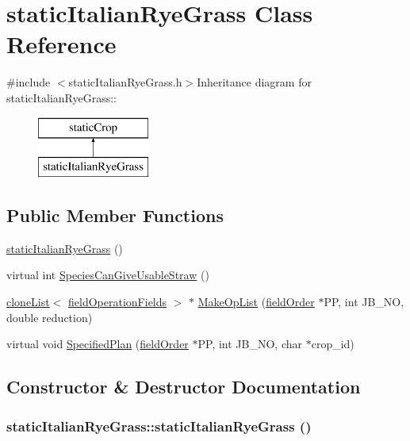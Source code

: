 \hypertarget{classstatic_italian_rye_grass}{
\section{staticItalianRyeGrass Class Reference}
\label{classstatic_italian_rye_grass}
}


{\ttfamily \#include $<$staticItalianRyeGrass.h$>$}Inheritance diagram for staticItalianRyeGrass::\begin{figure}[H]
\begin{center}
\leavevmode
\includegraphics[height=2cm]{classstatic_italian_rye_grass}
\end{center}
\end{figure}
\subsection*{Public Member Functions}
\begin{DoxyCompactItemize}
\item 
\hyperlink{classstatic_italian_rye_grass_a8c4620738fbd8657eadb0b5122c0dbb5}{staticItalianRyeGrass} ()
\item 
virtual int \hyperlink{classstatic_italian_rye_grass_a9d5e2ec0dc3a216104a37343dd69cc75}{SpeciesCanGiveUsableStraw} ()
\item 
\hyperlink{classclone_list}{cloneList}$<$ \hyperlink{classfield_operation_fields}{fieldOperationFields} $>$ $\ast$ \hyperlink{classstatic_italian_rye_grass_ad26f7e4790a4eb3235a8d6f56840c826}{MakeOpList} (\hyperlink{classfield_order}{fieldOrder} $\ast$PP, int JB\_\-NO, double reduction)
\item 
virtual void \hyperlink{classstatic_italian_rye_grass_a059473a7b43838cbd8c0d125f0533e32}{SpecifiedPlan} (\hyperlink{classfield_order}{fieldOrder} $\ast$PP, int JB\_\-NO, char $\ast$crop\_\-id)
\end{DoxyCompactItemize}


\subsection{Constructor \& Destructor Documentation}
\hypertarget{classstatic_italian_rye_grass_a8c4620738fbd8657eadb0b5122c0dbb5}{
\subsubsection[{staticItalianRyeGrass}]{\setlength{\rightskip}{0pt plus 5cm}staticItalianRyeGrass::staticItalianRyeGrass ()}}
\label{classstatic_italian_rye_grass_a8c4620738fbd8657eadb0b5122c0dbb5}


